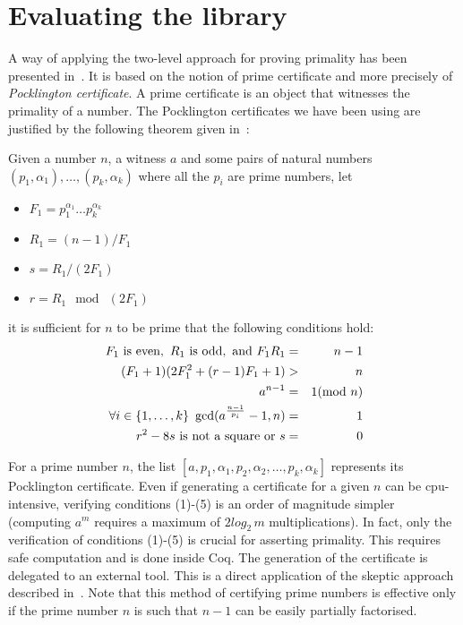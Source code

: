 \section{Evaluating the library \label{bench}}

A way of applying  the two-level approach for proving primality has been presented in~\cite{GreTheWer}.
It is based on the notion of prime certificate and more 
precisely of {\it Pocklington certificate}.
A prime certificate is an object that witnesses the primality of a number.
The Pocklington certificates we have been using are justified by the following
theorem given in~\cite{lehmer}:
\begin{theorem}\label{lehmer}
Given a number $n$, a witness $a$ and some pairs of natural numbers 
$(p_1,\alpha_1),\dots,(p_k,\alpha_k)$
 where all the $p_i$ are prime numbers,
 let
 \begin{itemize}
\item[]$F_1 = p_1^{\alpha_1}\dots p_k^{\alpha_k}$
\item[]$R_1 = (n - 1) / F_1$
\item[]$ s = R_1 / (2F_1)$
\item[] $r = R_1 \mod\ (2F_1)$
 \end{itemize}
 it is sufficient for $n$ to be prime that the following conditions hold:
\begin{eqnarray}
F_1 \,\,\hbox{is even},\,\,
R_1 \,\, \hbox{is odd}, \,\,\hbox{and}\,\,
F_1R_1  &=&  n -1\\
(F_1 + 1) (2F_1^2 + (r - 1) F_1 + 1) & >& n\\
a^{n-1} &=& 1 (\mod\ n)\\
\forall i\in\{1,\dots,k\}~\gcd(a^{\frac{n-1}{p_i}}-1,n)&=&1\\
r^2 - 8 s\,\,\mbox{is not a square}\,\,\hbox{or}\,\,s &=& 0
\end{eqnarray}
\end{theorem}
For a prime number $n$, the list 
$[a, p_1, \alpha_1, p_2, \alpha_2, \dots, p_k, \alpha_k]$
represents its Pocklington certificate.
Even if generating a certificate for a given $n$ can be cpu-intensive, 
verifying conditions (1)-(5) is an order of magnitude simpler (computing $a^m$ requires
a maximum of $2\textit{log}_2\, m$ multiplications). In fact, only
the verification of conditions (1)-(5) is crucial for asserting primality. 
This requires safe computation and is done inside {\sc Coq}.
The generation of the certificate is delegated to an external tool.
This is a direct application of the skeptic approach described 
in~\cite{BarBar,HarThe}. Note that this method of certifying prime numbers
is effective only if the prime number $n$ is such that  $n-1$ can be easily
partially factorised.
                 
